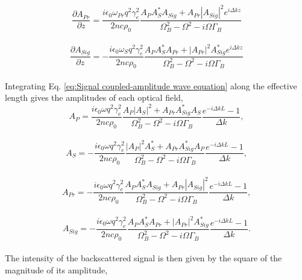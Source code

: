 \documentclass[
sn-nature,
twocolumn
]{sn-jnl}%
\begin{document}
\begin{appendices}
\begin{equation}
\end{equation}
\\
\begin{equation}
    \frac{\partial A_{Pr}}{\partial z} = \frac{i\epsilon_{0}\omega_{Pr} q^{2}\gamma_{e}^{2}}{2nc\rho_{0}}\frac{A_{P}A_{S}^{*}A_{Sig} + A_{Pr}|A_{Sig}|^{2}e^{i\Delta kz}}{\Omega_{B}^{2} - \Omega^{2} - i\Omega\Gamma_{B}}
\end{equation}
\\
\begin{equation}
    \frac{\partial A_{Sig}}{\partial z} = -\frac{i\epsilon_{0}\omega_{S} q^{2}\gamma_{e}^{2}}{2nc\rho_{0}}\frac{A_{P}A_{S}^{*}A_{Pr} + |A_{Pr}|^{2}A_{Sig}^{*}e^{i\Delta kz}}{\Omega_{B}^{2} - \Omega^{2} - i\Omega\Gamma_{B}}
    \label{eq:Signal coupled-amplitude wave equation}
\end{equation}
\\
Integrating Eq. \ref{eq:Signal coupled-amplitude wave equation} along the effective length gives the amplitudes of each optical field,
\\
\begin{equation}
  A_{P} = \frac{i\epsilon_{0}\omega q^{2}\gamma_{e}^{2}}{2nc\rho_{0}}\frac{A_{P}|A_{S}|^{2} + A_{Pr}A_{Sig}^{*}A_{S}}{\Omega_{B}^{2}-\Omega^{2}-i\Omega\Gamma_{B}} \frac{e^{-i\Delta kL}-1}{\Delta k},
\end{equation}
\\
\begin{equation}
  A_{S} = -\frac{i\epsilon_{0}\omega q^{2}\gamma_{e}^{2}}{2nc\rho_{0}}\frac{|A_{P}|^{2}A_{S}^{*} + A_{Pr}A_{Sig}^{*}A_{P}}{\Omega_{B}^{2}-\Omega^{2}-i\Omega\Gamma_{B}} \frac{e^{-i\Delta kL}-1}{\Delta k},
\end{equation}
\\
\begin{equation}
  A_{Pr} = -\frac{i\epsilon_{0}\omega q^{2}\gamma_{e}^{2}}{2nc\rho_{0}}\frac{A_{P}A_{S}^{*}A_{Sig} + A_{Pr}|A_{Sig}|^{2}}{\Omega_{B}^{2}-\Omega^{2}-i\Omega\Gamma_{B}} \frac{e^{-i\Delta kL}-1}{\Delta k},
\end{equation}
\\
\begin{equation}
  A_{Sig} = -\frac{i\epsilon_{0}\omega q^{2}\gamma_{e}^{2}}{2nc\rho_{0}}\frac{A_{P}A_{S}^{*}A_{Pr} + |A_{Pr}|^{2}A_{Sig}^{*}}{\Omega_{B}^{2}-\Omega^{2}-i\Omega\Gamma_{B}} \frac{e^{-i\Delta kL}-1}{\Delta k}.
\end{equation}
\\
The intensity of the backscattered signal is then given by the square of the magnitude of its amplitude,

\end{appendices}
\end{document}
